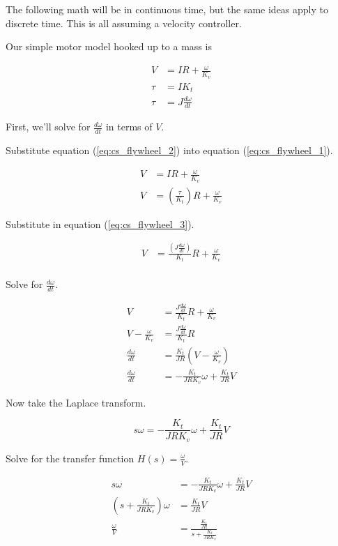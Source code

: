 The following math will be in continuous time, but the same ideas apply to
discrete time. This is all assuming a velocity controller.

Our simple motor model hooked up to a mass is

\begin{align}
  V &= IR + \frac{\omega}{K_v} \label{eq:cs_flywheel_1} \\
  \tau &= I K_t \label{eq:cs_flywheel_2} \\
  \tau &= J \frac{d\omega}{dt} \label{eq:cs_flywheel_3}
\end{align}

First, we'll solve for $\frac{d\omega}{dt}$ in terms of $V$.

Substitute equation (\ref{eq:cs_flywheel_2}) into equation
 (\ref{eq:cs_flywheel_1}).

\begin{align*}
  V &= IR + \frac{\omega}{K_v} \\
  V &= \left(\frac{\tau}{K_t}\right) R + \frac{\omega}{K_v}
\end{align*}

Substitute in equation (\ref{eq:cs_flywheel_3}).

\begin{align*}
  V &= \frac{\left(J \frac{d\omega}{dt}\right)}{K_t} R + \frac{\omega}{K_v} \\
\end{align*}

Solve for $\frac{d\omega}{dt}$.

\begin{align*}
  V &= \frac{J \frac{d\omega}{dt}}{K_t} R + \frac{\omega}{K_v} \\
  V - \frac{\omega}{K_v} &= \frac{J \frac{d\omega}{dt}}{K_t} R \\
  \frac{d\omega}{dt} &= \frac{K_t}{JR} \left(V - \frac{\omega}{K_v}\right) \\
  \frac{d\omega}{dt} &= -\frac{K_t}{JRK_v} \omega + \frac{K_t}{JR} V
\end{align*}

Now take the Laplace transform.

\begin{equation}
  s \omega = -\frac{K_t}{JRK_v} \omega + \frac{K_t}{JR} V
  \label{eq:cs_motor_tf}
\end{equation}

Solve for the transfer function $H(s) = \frac{\omega}{V}$.

\begin{align*}
  s \omega &= -\frac{K_t}{JRK_v} \omega + \frac{K_t}{JR} V \\
  \left(s + \frac{K_t}{JRK_v}\right) \omega &= \frac{K_t}{JR} V \\
  \frac{\omega}{V} &= \frac{\frac{K_t}{JR}}{s + \frac{K_t}{JRK_v}} \\
\end{align*}

